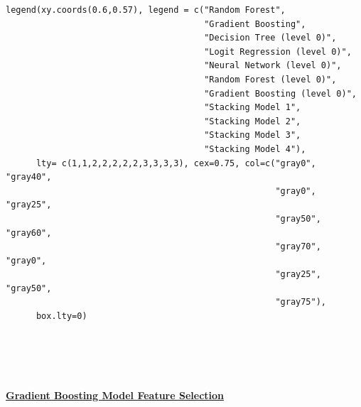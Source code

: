 \documentclass[12pt]{article}
\begin{document}
\begin{lstlisting}
legend(xy.coords(0.6,0.57), legend = c("Random Forest", 
                                       "Gradient Boosting", 
                                       "Decision Tree (level 0)",
                                       "Logit Regression (level 0)", 
                                       "Neural Network (level 0)", 
                                       "Random Forest (level 0)",
                                       "Gradient Boosting (level 0)",
                                       "Stacking Model 1",
                                       "Stacking Model 2", 
                                       "Stacking Model 3", 
                                       "Stacking Model 4"), 
      lty= c(1,1,2,2,2,2,2,3,3,3,3), cex=0.75, col=c("gray0", "gray40", 
                                                     "gray0", "gray25", 
                                                     "gray50", "gray60", 
                                                     "gray70", "gray0", 
                                                     "gray25", "gray50", 
                                                     "gray75"),
      box.lty=0)
       
       
       
       
\end{lstlisting}

\begin{algorithm}
\caption[Quantlet 2: Gradient Boosting Model Feature Selection]{\href{https://github.com/schreckf/NIC_Schreck/blob/master/code}{\large\textbf{Gradient Boosting Model Feature Selection}}}
\end{algorithm}
\end{document}
